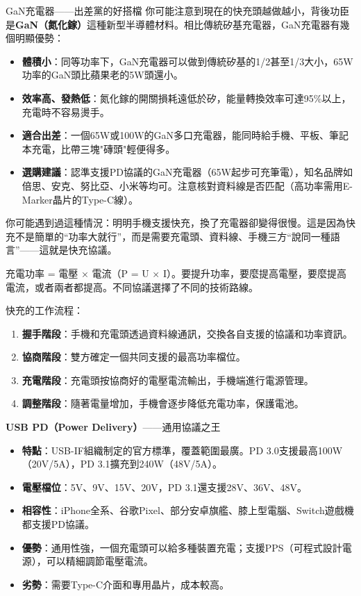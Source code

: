 \begin{tcbinfo}{GaN充電器——出差黨的好搭檔}
你可能注意到現在的快充頭越做越小，背後功臣是\textbf{GaN（氮化鎵）}這種新型半導體材料。相比傳統矽基充電器，GaN充電器有幾個明顯優勢：

\begin{itemize}
  \item \textbf{體積小}：同等功率下，GaN充電器可以做到傳統矽基的1/2甚至1/3大小，65W功率的GaN頭比蘋果老的5W頭還小。
  \item \textbf{效率高、發熱低}：氮化鎵的開關損耗遠低於矽，能量轉換效率可達95\%以上，充電時不容易燙手。
  \item \textbf{適合出差}：一個65W或100W的GaN多口充電器，能同時給手機、平板、筆記本充電，比帶三塊"磚頭"輕便得多。
  \item \textbf{選購建議}：認準支援PD協議的GaN充電器（65W起步可充筆電），知名品牌如倍思、安克、努比亞、小米等均可。注意核對資料線是否匹配（高功率需用E-Marker晶片的Type-C線）。
\end{itemize}

\end{tcbinfo}


你可能遇到過這種情況：明明手機支援快充，換了充電器卻變得很慢。這是因為快充不是簡單的“功率大就行”，而是需要充電頭、資料線、手機三方“說同一種語言”——這就是快充協議。


充電功率 = 電壓 × 電流（P = U × I）。要提升功率，要麼提高電壓，要麼提高電流，或者兩者都提高。不同協議選擇了不同的技術路線。

快充的工作流程：

\begin{enumerate}
  \item \textbf{握手階段}：手機和充電頭透過資料線通訊，交換各自支援的協議和功率資訊。
  \item \textbf{協商階段}：雙方確定一個共同支援的最高功率檔位。
  \item \textbf{充電階段}：充電頭按協商好的電壓電流輸出，手機端進行電源管理。
  \item \textbf{調整階段}：隨著電量增加，手機會逐步降低充電功率，保護電池。
\end{enumerate}


\textbf{USB PD（Power Delivery）}——通用協議之王

\begin{itemize}
  \item \textbf{特點}：USB-IF組織制定的官方標準，覆蓋範圍最廣。PD 3.0支援最高100W（20V/5A），PD 3.1擴充到240W（48V/5A）。
  \item \textbf{電壓檔位}：5V、9V、15V、20V，PD 3.1還支援28V、36V、48V。
  \item \textbf{相容性}：iPhone全系、谷歌Pixel、部分安卓旗艦、膝上型電腦、Switch遊戲機都支援PD協議。
  \item \textbf{優勢}：通用性強，一個充電頭可以給多種裝置充電；支援PPS（可程式設計電源），可以精細調節電壓電流。
  \item \textbf{劣勢}：需要Type-C介面和專用晶片，成本較高。
\end{itemize}


